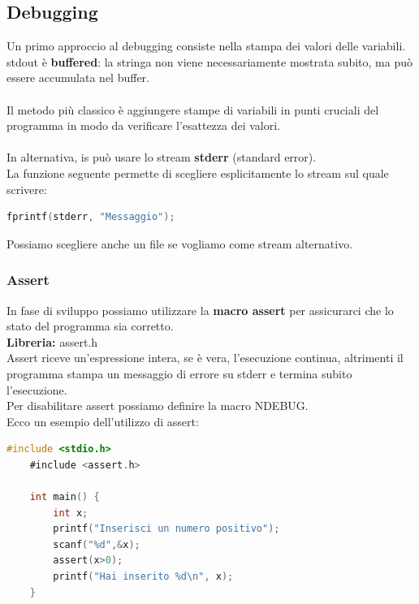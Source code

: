 \documentclass[12pt,a4paper]{article}
\begin{document}
\subsection{Debugging}
Un primo approccio al debugging consiste nella stampa dei valori delle variabili.
stdout è \textbf{buffered}: la stringa non viene necessariamente mostrata subito, ma può essere accumulata nel buffer.\\\\
Il metodo più classico è aggiungere stampe di variabili in punti cruciali del programma in modo da verificare l'esattezza dei valori.\\\\
In alternativa, is può usare lo stream \textbf{stderr} (standard error).\\
La funzione seguente permette di scegliere esplicitamente lo stream sul quale scrivere:
\begin{lstlisting}[language=C]
    fprintf(stderr, "Messaggio");
\end{lstlisting}
Possiamo scegliere anche un file se vogliamo come stream alternativo.
\subsubsection{Assert}
In fase di sviluppo possiamo utilizzare la \textbf{macro assert} per assicurarci che lo stato del programma sia corretto.\\
\textbf{Libreria:} assert.h\\
Assert riceve un'espressione intera, se è vera, l'esecuzione continua, altrimenti il programma stampa un messaggio di errore su stderr e termina subito l'esecuzione.\\
Per disabilitare assert possiamo definire la macro NDEBUG.\\
Ecco un esempio dell'utilizzo di assert:
\begin{lstlisting}[language=C]
    #include <stdio.h>
    #include <assert.h>

    int main() {
        int x;
        printf("Inserisci un numero positivo");
        scanf("%d",&x);
        assert(x>0);
        printf("Hai inserito %d\n", x);
    }
\end{lstlisting}
\end{document}
